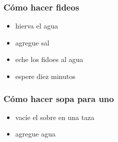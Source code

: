 \documentclass{beamer}
\begin{document}
\begin{frame}
    \frametitle{Cómo hacer fideos}
    \begin{itemize}
        \item hierva el agua
        \item agregue sal
        \item eche los fidoes al agua
        \item espere diez minutos
    \end{itemize}
\end{frame}

\begin{frame}
    \frametitle{Cómo hacer sopa para uno}
    \begin{itemize}
        \item vacíe el sobre en una taza
        \item agregue agua
    \end{itemize}
\end{frame}
\end{document}

